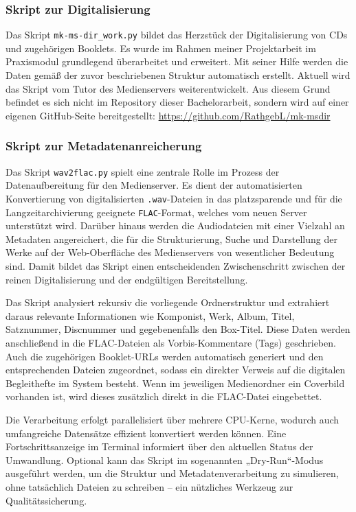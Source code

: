 \documentclass[12pt,a4paper]{report}
\begin{document}
  \subsubsection*{Skript zur Digitalisierung}
  Das Skript \texttt{mk-ms-dir\_work.py} bildet das Herzstück der Digitalisierung von CDs und zugehörigen Booklets.
  Es wurde im Rahmen meiner Projektarbeit im Praxismodul grundlegend überarbeitet und erweitert. 
  Mit seiner Hilfe werden die Daten gemäß der zuvor beschriebenen Struktur automatisch erstellt. 
  Aktuell wird das Skript vom Tutor des Medienservers weiterentwickelt.
  Aus diesem Grund befindet es sich nicht im Repository dieser Bachelorarbeit, 
  sondern wird auf einer eigenen GitHub-Seite bereitgestellt: \url{https://github.com/RathgebL/mk-msdir}
 
  \subsubsection*{Skript zur Metadatenanreicherung}
  Das Skript \texttt{wav2flac.py} spielt eine zentrale Rolle im Prozess der Datenaufbereitung für den Medienserver. 
  Es dient der automatisierten Konvertierung von digitalisierten \texttt{.wav}-Dateien in das platzsparende und für die Langzeitarchivierung geeignete 
  \texttt{FLAC}-Format, welches vom neuen Server unterstützt wird. 
  Darüber hinaus werden die Audiodateien mit einer Vielzahl an Metadaten angereichert, die für die Strukturierung, 
  Suche und Darstellung der Werke auf der Web-Oberfläche des Medienservers von wesentlicher Bedeutung sind.  
  Damit bildet das Skript einen entscheidenden Zwischenschritt zwischen der reinen Digitalisierung und der endgültigen Bereitstellung.

  Das Skript analysiert rekursiv die vorliegende Ordnerstruktur und extrahiert daraus relevante Informationen wie Komponist, Werk, Album, Titel, 
  Satznummer, Discnummer und gegebenenfalls den Box-Titel. 
  Diese Daten werden anschließend in die FLAC-Dateien als Vorbis-Kommentare (Tags) geschrieben. 
  Auch die zugehörigen Booklet-URLs werden automatisch generiert und den entsprechenden Dateien zugeordnet, 
  sodass ein direkter Verweis auf die digitalen Begleithefte im System besteht.  
  Wenn im jeweiligen Medienordner ein Coverbild vorhanden ist, wird dieses zusätzlich direkt in die FLAC-Datei eingebettet.

  Die Verarbeitung erfolgt parallelisiert über mehrere CPU-Kerne, wodurch auch umfangreiche Datensätze effizient konvertiert werden können. 
  Eine Fortschrittsanzeige im Terminal informiert über den aktuellen Status der Umwandlung. 
  Optional kann das Skript im sogenannten „Dry-Run“-Modus ausgeführt werden, um die Struktur und Metadatenverarbeitung zu simulieren, 
  ohne tatsächlich Dateien zu schreiben – ein nützliches Werkzeug zur Qualitätssicherung.
\end{document}
